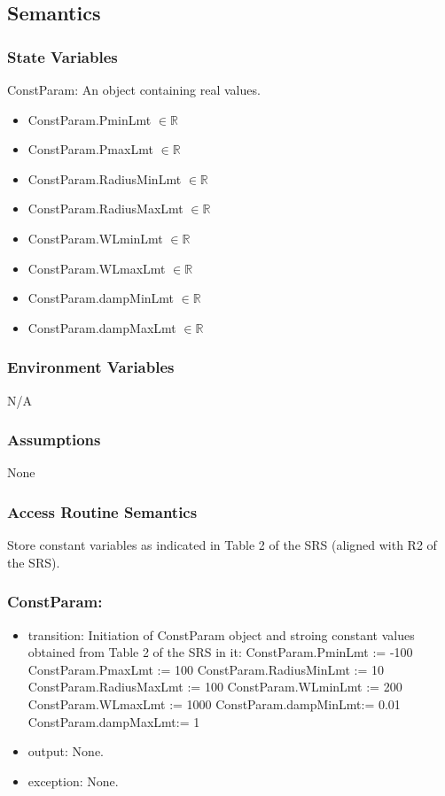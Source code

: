 \documentclass[12pt, titlepage]{article}
\begin{document}
	\subsection{Semantics}	
	
	\subsubsection{State Variables}
	ConstParam: An object containing real values.
	\begin{itemize}	
		\item ConstParam.PminLmt $\in \mathbb{R}$
		\item ConstParam.PmaxLmt $\in \mathbb{R}$
		\item ConstParam.RadiusMinLmt $\in \mathbb{R}$
		\item ConstParam.RadiusMaxLmt $\in \mathbb{R}$
		\item ConstParam.WLminLmt $\in \mathbb{R}$
		\item ConstParam.WLmaxLmt $\in \mathbb{R}$
		\item ConstParam.dampMinLmt $\in \mathbb{R}$
		\item ConstParam.dampMaxLmt $\in \mathbb{R}$		
	\end{itemize}
	
	\subsubsection{Environment Variables}
	
	N/A \subsubsection{Assumptions}
	
	None
	
	\subsubsection{Access Routine Semantics}
	Store constant variables as indicated in Table 2 of the SRS (aligned with R2 of the SRS). 
	 
	\subsubsection*{ConstParam:} \begin{itemize} \item transition: Initiation of ConstParam object and stroing constant values obtained from Table 2 of the SRS in it:
		\subitem ConstParam.PminLmt := -100
		\subitem ConstParam.PmaxLmt := 100
		\subitem ConstParam.RadiusMinLmt := 10
		\subitem ConstParam.RadiusMaxLmt := 100
		\subitem ConstParam.WLminLmt := 200
		\subitem ConstParam.WLmaxLmt := 1000
		\subitem ConstParam.dampMinLmt:= 0.01
		\subitem ConstParam.dampMaxLmt:= 1	
		   
		   \item output: None. \item exception: None. \end{itemize}
	
\end{document}
